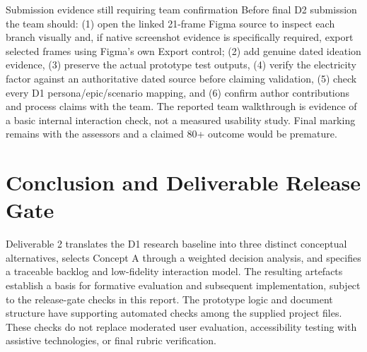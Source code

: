 \documentclass[12pt,a4paper]{article}
\begin{document}
\begin{cautionbox}{Submission evidence still requiring team confirmation}
Before final D2 submission the team should: (1) open the linked 21-frame Figma source to inspect each branch visually and, if native screenshot evidence is specifically required, export selected frames using Figma's own Export control; (2) add genuine dated ideation evidence, (3) preserve the actual prototype test outputs, (4) verify the electricity factor against an authoritative dated source before claiming validation, (5) check every D1 persona/epic/scenario mapping, and (6) confirm author contributions and process claims with the team. The reported team walkthrough is evidence of a basic internal interaction check, not a measured usability study. Final marking remains with the assessors and a claimed 80+ outcome would be premature.
\end{cautionbox}

\section{Conclusion and Deliverable Release Gate}

Deliverable 2 translates the D1 research baseline into three distinct conceptual alternatives, selects Concept A through a weighted decision analysis, and specifies a traceable backlog and low-fidelity interaction model. The resulting artefacts establish a basis for formative evaluation and subsequent implementation, subject to the release-gate checks in this report. The prototype logic and document structure have supporting automated checks among the supplied project files. These checks do not replace moderated user evaluation, accessibility testing with assistive technologies, or final rubric verification.
\end{document}
